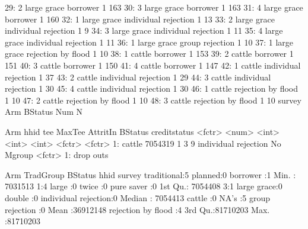 \begin{Schunk}
\begin{Soutput}
29:      2 large grace             borrower     1   163
30:      3 large grace             borrower     1   163
31:      4 large grace             borrower     1   160
32:      1 large grace individual rejection     1    13
33:      2 large grace individual rejection     1     9
34:      3 large grace individual rejection     1    11
35:      4 large grace individual rejection     1    11
36:      1 large grace      group rejection     1    10
37:      1 large grace   rejection by flood     1    10
38:      1      cattle             borrower     1   153
39:      2      cattle             borrower     1   151
40:      3      cattle             borrower     1   150
41:      4      cattle             borrower     1   147
42:      1      cattle individual rejection     1    37
43:      2      cattle individual rejection     1    29
44:      3      cattle individual rejection     1    30
45:      4      cattle individual rejection     1    30
46:      1      cattle   rejection by flood     1    10
47:      2      cattle   rejection by flood     1    10
48:      3      cattle   rejection by flood     1    10
    survey         Arm              BStatus   Num     N
\end{Soutput}
\begin{Soutput}
      Arm    hhid   tee MaxTee AttritIn              BStatus creditstatus
   <fctr>   <num> <int>  <int>    <int>               <fctr>       <fctr>
1: cattle 7054319     1      3        9 individual rejection           No
      Mgroup
      <fctr>
1: drop outs
\end{Soutput}
\begin{Soutput}
          Arm      TradGroup                 BStatus       hhid          survey
 traditional:5   planned:0   borrower            :1   Min.   : 7031513   1:4   
 large      :0   twice  :0   pure saver          :0   1st Qu.: 7054408   3:1   
 large grace:0   double :0   individual rejection:0   Median : 7054413         
 cattle     :0   NA's   :5   group rejection     :0   Mean   :36912148         
                             rejection by flood  :4   3rd Qu.:81710203         
                                                      Max.   :81710203         
                                                                               

\end{Soutput}
\end{Schunk}

